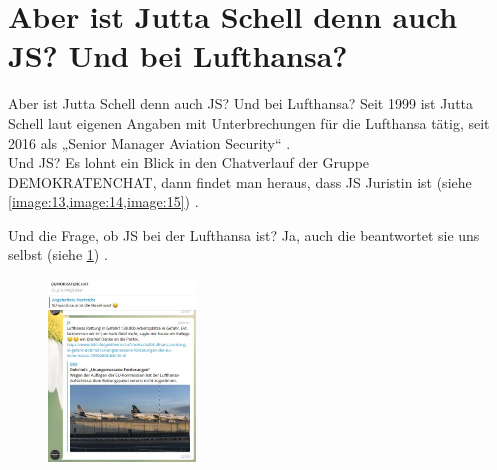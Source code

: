 \section{Aber ist Jutta Schell denn auch JS? Und bei Lufthansa?}
Aber ist Jutta Schell denn auch JS? Und bei Lufthansa?
Seit 1999 ist Jutta Schell laut eigenen Angaben mit Unterbrechungen für die Lufthansa tätig, seit 2016 als „Senior Manager Aviation Security“ \autocite{14}.\\

Und JS? Es lohnt ein Blick in den Chatverlauf der Gruppe DEMOKRATENCHAT, dann findet man heraus, dass JS Juristin ist (siehe \cref{image:13,image:14,image:15}) \autocite{15}\autocite{16}\autocite{17} .

\begin{figure}[hbt!]\centering
  \caption{}
\end{figure}

Und die Frage, ob JS bei der Lufthansa ist? Ja, auch die beantwortet
sie uns selbst (siehe \cref{image:16})\autocite{18} .
\begin{figure}[hbt!]\centering \vspace{-10pt}
  \includegraphics[width=0.35\textwidth]{images/image--016.jpg}
  \caption{}\label{image:16}
\end{figure}

